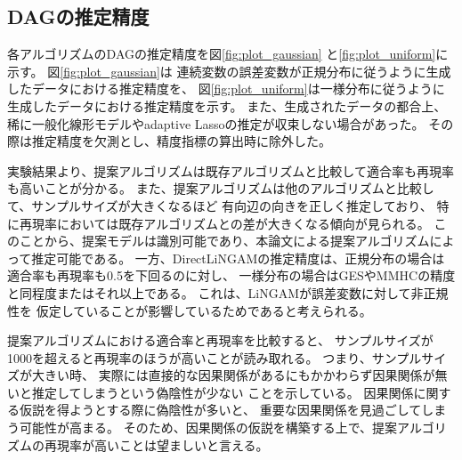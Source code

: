 
\subsection{DAGの推定精度}

各アルゴリズムのDAGの推定精度を図\ref{fig:plot_gaussian}
と\ref{fig:plot_uniform}に示す。
図\ref{fig:plot_gaussian}は
連続変数の誤差変数が正規分布に従うように生成したデータにおける推定精度を、
図\ref{fig:plot_uniform}は一様分布に従うように生成したデータにおける推定精度を示す。
また、生成されたデータの都合上、
稀に一般化線形モデルやadaptive Lassoの推定が収束しない場合があった。
その際は推定精度を欠測とし、精度指標の算出時に除外した。

実験結果より、提案アルゴリズムは既存アルゴリズムと比較して適合率も再現率も高いことが分かる。
また、提案アルゴリズムは他のアルゴリズムと比較して、サンプルサイズが大きくなるほど
有向辺の向きを正しく推定しており、
特に再現率においては既存アルゴリズムとの差が大きくなる傾向が見られる。
このことから、提案モデルは識別可能であり、本論文による提案アルゴリズムによって推定可能である。
一方、DirectLiNGAMの推定精度は、正規分布の場合は適合率も再現率も0.5を下回るのに対し、
一様分布の場合はGESやMMHCの精度と同程度またはそれ以上である。
これは、LiNGAM\cite{Shimizu2011-pd}が誤差変数に対して非正規性を
仮定していることが影響しているためであると考えられる。

提案アルゴリズムにおける適合率と再現率を比較すると、
サンプルサイズが1000を超えると再現率のほうが高いことが読み取れる。
つまり、サンプルサイズが大きい時、
実際には直接的な因果関係があるにもかかわらず因果関係が無いと推定してしまうという偽陰性が少ない
ことを示している。
因果関係に関する仮説を得ようとする際に偽陰性が多いと、
重要な因果関係を見過ごしてしまう可能性が高まる。
そのため、因果関係の仮説を構築する上で、提案アルゴリズムの再現率が高いことは望ましいと言える。

